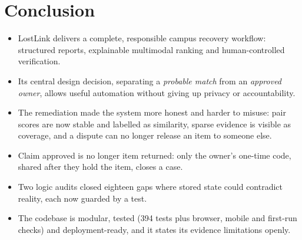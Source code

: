 \documentclass[12pt,a4paper,oneside]{report}
\begin{document}
\section{Conclusion}
\begin{itemize}
  \item LostLink delivers a complete, responsible campus recovery workflow: structured reports, explainable multimodal ranking and human-controlled verification.
  \item Its central design decision, separating a \emph{probable match} from an \emph{approved owner}, allows useful automation without giving up privacy or accountability.
  \item The remediation made the system more honest and harder to misuse: pair scores are now stable and labelled as similarity, sparse evidence is visible as coverage, and a dispute can no longer release an item to someone else.
  \item Claim approved is no longer item returned: only the owner's one-time code, shared after they hold the item, closes a case.
  \item Two logic audits closed eighteen gaps where stored state could contradict reality, each now guarded by a test.
  \item The codebase is modular, tested (394 tests plus browser, mobile and first-run checks) and deployment-ready, and it states its evidence limitations openly.
\end{itemize}
\end{document}
